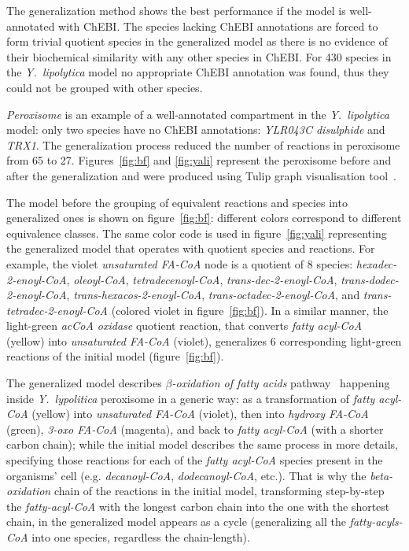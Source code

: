 \documentclass[9pt]{article}
\newcounter{fig}
\newcounter{rm}
\begin{document}
The generalization method shows the best performance if the model is well-annotated with ChEBI. The species lacking ChEBI annotations are forced to form trivial quotient species in the generalized model as there is no evidence of their biochemical similarity with any other species in ChEBI.  For 430 species in the \textit{Y.~lipolytica} model no appropriate ChEBI annotation was found, thus they could not be grouped with other species. 

\emph{Peroxisome} is an example of a well-annotated compartment in the \textit{Y.~lipolytica} model: only two species have no ChEBI annotations: \emph{YLR043C disulphide} and \emph{TRX1}. The generalization process reduced the number of reactions in peroxisome from 65 to 27. Figures~\ref{fig:bf} and \ref{fig:yali} represent the peroxisome before and after the generalization and were produced using Tulip graph visualisation tool~\citep{Auber04}.

The model before the grouping of equivalent reactions and species into generalized ones is shown on figure~\ref{fig:bf}: different colors correspond to different equivalence classes. The same color code is used in figure~\ref{fig:yali} representing the generalized model that operates with quotient species and reactions. For example, the violet \textit{unsaturated FA-CoA} node is a quotient of 8 species: \textit{hexadec-2-enoyl-CoA}, \textit{oleoyl-CoA}, \textit{tetradecenoyl-CoA}, \textit{trans-dec-2-enoyl-CoA}, \textit{trans-dodec-2-enoyl-CoA}, \textit{trans-hexacos-2-enoyl-CoA}, \textit{trans-octadec-2-enoyl-CoA}, and \textit{trans-tetradec-2-enoyl-CoA} (colored violet in figure~\ref{fig:bf}). In a similar manner, the light-green \textit{acCoA oxidase} quotient reaction, that converts \textit{fatty acyl-CoA} (yellow) into \textit{unsaturated FA-CoA} (violet), generalizes 6 corresponding light-green reactions of the initial model (figure~\ref{fig:bf}).

The generalized model describes \textit{$\beta$-oxidation of fatty acids} pathway~\citep{Metzler01} happening inside \textit{Y.~lypolitica} peroxisome in a generic way: as a transformation of \textit{fatty acyl-CoA} (yellow) into \textit{unsaturated FA-CoA} (violet), then into \textit{hydroxy FA-CoA} (green), \textit{3-oxo FA-CoA} (magenta), and back to \textit{fatty acyl-CoA} (with a shorter carbon chain); while the initial model describes the same process in more details, specifying those reactions for each of the \textit{fatty acyl-CoA} species present in the organisms' cell (e.g. \textit{decanoyl-CoA}, \textit{dodecanoyl-CoA}, etc.). That is why the \textit{beta-oxidation} chain of the reactions in the initial model, transforming step-by-step the \emph{fatty-acyl-CoA} with the longest carbon chain into the one with the shortest chain, in the generalized model appears as a cycle (generalizing all the \textit{fatty-acyls-CoA} into one species, regardless the chain-length).
  
\end{document}
